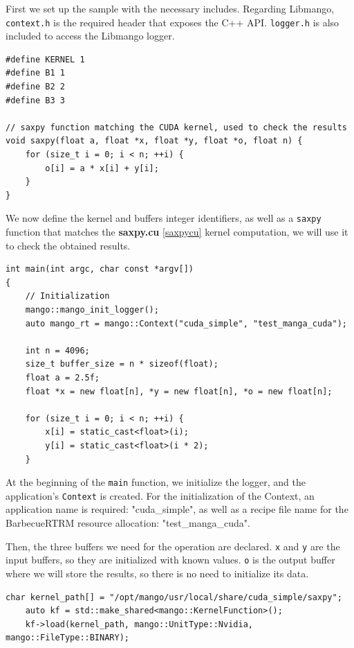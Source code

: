 First we set up the sample with the necessary includes. Regarding Libmango, \texttt{context.h} is the required header that exposes the C++ API. \texttt{logger.h} is also included to access the Libmango logger.

\begin{lstlisting}[style=CStyle, caption=Sample - Definitions]
#define KERNEL 1
#define B1 1
#define B2 2
#define B3 3

// saxpy function matching the CUDA kernel, used to check the results
void saxpy(float a, float *x, float *y, float *o, float n) {
    for (size_t i = 0; i < n; ++i) {
        o[i] = a * x[i] + y[i];
    }
}
\end{lstlisting}

We now define the kernel and buffers integer identifiers, as well as a \texttt{saxpy} function that matches the \textbf{saxpy.cu} \ref{saxpycu} kernel computation, we will use it to check the obtained results.

\begin{lstlisting}[style=CStyle, caption=Sample - Initialization]
int main(int argc, char const *argv[])
{
    // Initialization
    mango::mango_init_logger();
    auto mango_rt = mango::Context("cuda_simple", "test_manga_cuda");

    int n = 4096;
    size_t buffer_size = n * sizeof(float);
    float a = 2.5f;
    float *x = new float[n], *y = new float[n], *o = new float[n];

    for (size_t i = 0; i < n; ++i) {
        x[i] = static_cast<float>(i);
        y[i] = static_cast<float>(i * 2);
    }
\end{lstlisting}

At the beginning of the \texttt{main} function, we initialize the logger, and the application's \texttt{Context} is created. For the initialization of the Context, an application name is required: "cuda\_simple", as well as a recipe file name for the BarbecueRTRM resource allocation: "test\_manga\_cuda".

Then, the three buffers we need for the operation are declared. \texttt{x} and \texttt{y} are the input buffers, so they are initialized with known values. \texttt{o} is the output buffer where we will store the results, so there is no need to initialize its data.

\begin{lstlisting}[style=CStyle, caption=Sample - Kernel loading]
    char kernel_path[] = "/opt/mango/usr/local/share/cuda_simple/saxpy";
    auto kf = std::make_shared<mango::KernelFunction>();
    kf->load(kernel_path, mango::UnitType::Nvidia, mango::FileType::BINARY);
\end{lstlisting}

